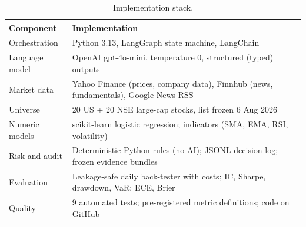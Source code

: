 \begin{table}[!t]
\centering\footnotesize
\caption{Implementation stack.}
\label{tab:stack}
\begin{tabularx}{\linewidth}{l Y}
\toprule
Component & Implementation \\
\midrule
Orchestration & Python 3.13, LangGraph state machine, LangChain \\
Language model & OpenAI gpt-4o-mini, temperature 0, structured (typed) outputs \\
Market data & Yahoo Finance (prices, company data), Finnhub (news, fundamentals), Google News RSS \\
Universe & 20 US + 20 NSE large-cap stocks, list frozen 6 Aug 2026 \\
Numeric models & scikit-learn logistic regression; indicators (SMA, EMA, RSI, volatility) \\
Risk and audit & Deterministic Python rules (no AI); JSONL decision log; frozen evidence bundles \\
Evaluation & Leakage-safe daily back-tester with costs; IC, Sharpe, drawdown, VaR; ECE, Brier \\
Quality & 9 automated tests; pre-registered metric definitions; code on GitHub \\
\bottomrule
\end{tabularx}
\end{table}
